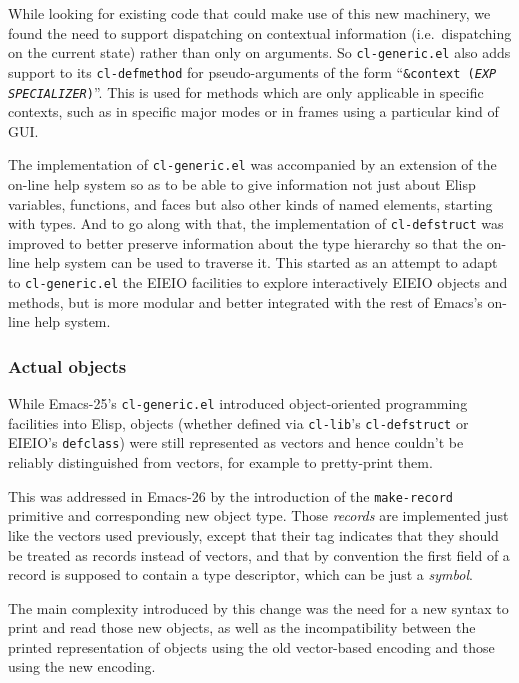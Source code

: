 \documentclass[format=acmsmall, review=false, screen=true]{acmart}
\newcommand \Elisp {Elisp}
\begin{document}
While looking for existing code that could make use of this new machinery,
we found the need to support dispatching on contextual information
(i.e.~dispatching on the current state) rather than only on arguments.
So \texttt{cl-generic.el} also adds support to its \texttt{cl-defmethod} for
pseudo-arguments of the form ``\texttt{\&context (\textsl{EXP}
  \textsl{SPECIALIZER})}''.  This is used for methods which are only
applicable in specific contexts, such as in specific major modes or in
frames using a particular kind of GUI.

The implementation of \texttt{cl-generic.el} was accompanied by an extension
of the on-line help system so as to be able to give information not just
about \Elisp{} variables, functions, and faces but also other kinds of named
elements, starting with types.  And to go along with that, the implementation
of \texttt{cl-defstruct} was improved to better preserve information about
the type hierarchy so that the on-line help system can be used to traverse
it.  This started as an attempt to adapt to \texttt{cl-generic.el} the EIEIO
facilities to explore interactively EIEIO objects and methods, but is more
modular and better integrated with the rest of Emacs's on-line help system.

\subsubsection{Actual objects}  %

While Emacs-25's \texttt{cl-generic.el} introduced object-oriented
programming facilities into \Elisp{}, objects (whether defined via
\texttt{cl-lib}'s \texttt{cl-defstruct} or EIEIO's \texttt{defclass}) were
still represented as vectors and hence couldn't be reliably distinguished
from vectors, for example to pretty-print them.

This was addressed in Emacs-26 by the introduction of the
\texttt{make-record} primitive and corresponding new object type.
Those \emph{records} are implemented just like the vectors used previously,
except that their tag indicates that they should be treated as records
instead of vectors, and that by convention the first field of a record is
supposed to contain a type descriptor, which can be just a \emph{symbol}.

The main complexity introduced by this change was the need for a new syntax
to print and read those new objects, as well as the incompatibility between
the printed representation of objects using the old vector-based encoding
and those using the new encoding.
\end{document}
